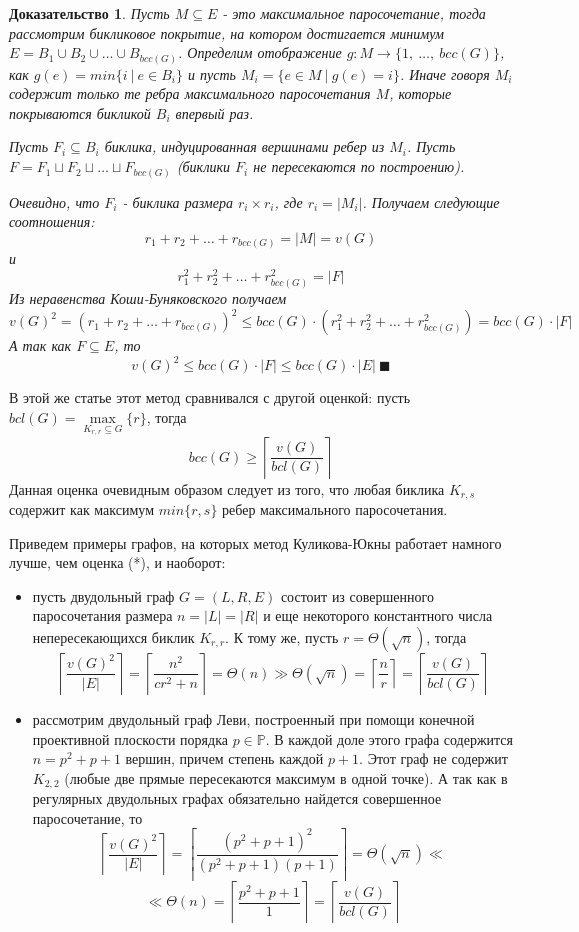 \documentclass[a4paper]{article}
\newtheorem*{msolution}{Доказательство}
\begin{document}
\begin{msolution}
	Пусть $M\subseteq E$ - это максимальное паросочетание, тогда рассмотрим бикликовое покрытие, 
	на котором достигается минимум $E = B_1\cup B_2\cup \ldots \cup B_{bcc(G)}$. Определим 
	отображение $g:M\rightarrow \{1,\ \ldots,\ bcc(G)\}$, как $g(e) = min\{i\ |\ e\in B_i\}$ и пусть 
	$M_i = \{e\in M\ |\ g(e) = i\}$. Иначе говоря $M_i$ содержит только те ребра максимального 
	паросочетания $M$, которые покрываются бикликой $B_i$ впервый раз.
	
	Пусть $F_i \subseteq B_i$ биклика, индуцированная вершинами ребер из $M_i$. Пусть 
	$F = F_1\sqcup F_2\sqcup \ldots \sqcup F_{bcc(G)}$ (биклики $F_i$ не пересекаются по построению).
	
	Очевидно, что $F_i$ - биклика размера $r_i\times r_i$, где $r_i = |M_i|$. Получаем следующие 
	соотношения: $$r_1 + r_2 + \ldots + r_{bcc(G)} = |M| = v(G)$$ и 
	$$r_1^2 + r_2^2 + \ldots + r_{bcc(G)}^2 = |F|$$ Из неравенства Коши-Буняковского получаем 
	$$v(G)^2 = (r_1 + r_2 + \ldots + r_{bcc(G)})^2 \leq bcc(G)\cdot (r_1^2 + r_2^2 + \ldots + r_{bcc(G)}^2) = bcc(G)\cdot |F|$$
	А так как $F \subseteq E$, то $$v(G)^2\leq bcc(G)\cdot |F| \leq bcc(G)\cdot |E|\ \blacksquare$$

\end{msolution}

В этой же статье \cite{KulikovJukna} этот метод сравнивался с другой оценкой: пусть $bcl(G) = \max\limits_{K_{r,r}\subseteq G}\{r\}$, 
тогда
\[bcc(G) \geq \left\lceil\frac{v(G)}{bcl(G)}\right\rceil \tag{*}\]
Данная оценка очевидным образом следует из того, что любая биклика $K_{r, s}$ содержит как максимум 
$min\{r, s\}$ ребер максимального паросочетания.

Приведем примеры графов, на которых метод Куликова-Юкны работает намного лучше, чем оценка (*), и наоборот:

\begin{itemize}
    \item пусть двудольный граф $G = (L, R, E)$ состоит из совершенного паросочетания размера 
    $n = |L| = |R|$ и еще некоторого константного числа непересекающихся биклик $K_{r,r}$. 
    К тому же, пусть $r = \Theta(\sqrt{n})$, тогда $$\left\lceil\frac{v(G)^2}{|E|}\right\rceil = 
    \left\lceil\frac{n^2}{cr^2 + n}\right\rceil = \Theta(n) \gg \Theta(\sqrt{n}) = \left\lceil\frac{n}{r}\right\rceil = 
    \left\lceil\frac{v(G)}{bcl(G)}\right\rceil$$ 
    \item рассмотрим двудольный граф Леви, построенный при помощи конечной проективной плоскости порядка 
    $p\in \mathbb{P}$. В каждой доле этого графа содержится $n = p^2 + p + 1$ вершин, причем степень 
    каждой $p+1$. Этот граф не содержит $K_{2,2}$ (любые две прямые пересекаются максимум в одной точке). 
    А так как в регулярных двудольных графах обязательно найдется совершенное паросочетание, то 
    $$\left\lceil\frac{v(G)^2}{|E|}\right\rceil = \left\lceil\frac{(p^2 + p + 1)^2}{(p^2+p+1)(p+1)}\right\rceil = 
    \Theta(\sqrt{n}) \ll$$ $$\ll \Theta(n) = \left\lceil\frac{p^2 + p + 1}{1}\right\rceil = \left\lceil\frac{v(G)}{bcl(G)}\right\rceil$$
\end{itemize}
\end{document}
